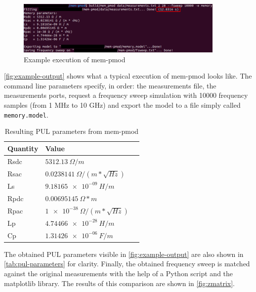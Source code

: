 \begin{figure}[htbp]
    \center
    \includegraphics[width = 0.9\textwidth]{img/example_output}
    \caption{Example execution of mem-pmod}
    \label{fig:example-output}
\end{figure}
\autoref{fig:example-output} shows what a typical execution of mem-pmod looks like. The command line parameters specify, in order: the measurements file, the measurements ports, request a frequency sweep simulation with 10000 frequency samples (from 1 MHz to 10 GHz) and export the model to a file simply called \texttt{memory.model}.
\begin{table}[htbp]
    \center
    \begin{tabular}{|l|l|l|}
        \hline
        Quantity & Value \\ \hline
        Rsdc & $\SI{5312.13}{\Omega / m}$ \\ \hline
        Rsac & $\SI{0.0238141}{\Omega / (m * \sqrt{Hz})}$ \\ \hline
        Ls   & $\SI{9.18165e-09}{H / m}$ \\ \hline
        Rpdc & $\SI{0.00695145}{\Omega * m}$ \\ \hline
        Rpac & $\SI{1e-38}{\Omega / (m * \sqrt{Hz})}$ \\ \hline
        Lp   & $\SI{4.74466e-28}{H / m}$ \\ \hline
        Cp   & $\SI{1.31426e-06}{F / m}$ \\ \hline
    \end{tabular}
    \caption{Resulting PUL parameters from mem-pmod}
    \label{tab:pul-parameters}
\end{table}
The obtained PUL parameters visible in \autoref{fig:example-output} are also shown in \autoref{tab:pul-parameters} for clarity. Finally, the obtained frequency sweep is matched against the original measurements with the help of a Python script and the matplotlib library. The results of this comparison are shown in \autoref{fig:zmatrix}.

